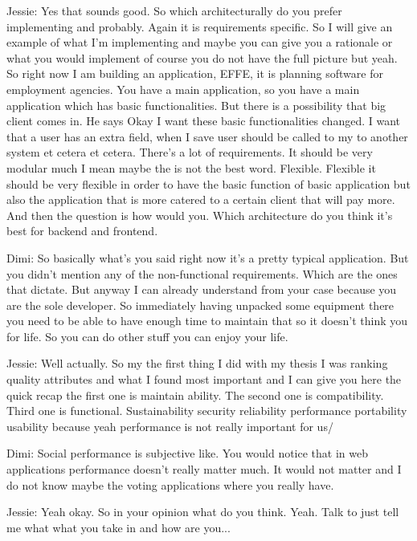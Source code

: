 Jessie: Yes that sounds good. So which architecturally do you prefer implementing and probably. Again it is requirements specific. So I will give an example of what I'm implementing and maybe you can give you a rationale or what you would implement of course you do not have the full picture but yeah. So right now I am building an application, EFFE, it is planning software for employment agencies. You have a main application, so you have a main application which has basic functionalities. But there is a possibility that big client comes in. He says Okay I want these basic functionalities changed. I want that a user has an extra field, when I save user should be called to my to another system et cetera et cetera. There's a lot of requirements. It should be very modular much I mean maybe the is not the best word. Flexible. Flexible it should be very flexible in order to have the basic function of basic application but also the application that is more catered to a certain client that will pay more. And then the question is how would you. Which architecture do you think it's best for backend and frontend.

Dimi: So basically what's you said right now it's a pretty typical application. But you didn't mention any of the non-functional requirements. Which are the ones that dictate. But anyway I can already understand from your case because you are the sole developer. So immediately having unpacked some equipment there you need to be able to have enough time to maintain that so it doesn't think you for life. So you can do other stuff you can enjoy your life.

Jessie: Well actually. So my the first thing I did with my thesis I was ranking quality attributes and what I found most important and I can give you here the quick recap the first one is maintain ability. The second one is compatibility. Third one is functional. Sustainability security reliability performance portability usability because yeah performance is not really important for us/

Dimi: Social performance is subjective like. You would notice that in web applications performance doesn't really matter much. It would not matter and I do not know maybe the voting applications where you really have.

Jessie: Yeah okay. So in your opinion what do you think. Yeah. Talk to just tell me what what you take in and how are you...


